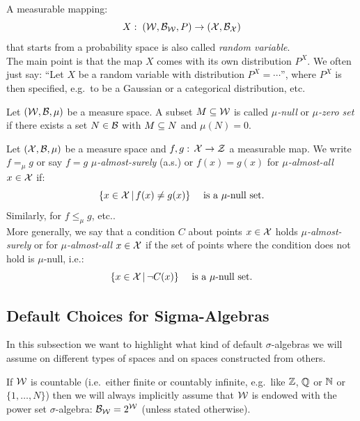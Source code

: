 \begin{Def}
    A measurable mapping: \[X:\; (\mathcal{W},\mathcal{B}_{\mathcal{W}},P) \to (\mathcal{X},\mathcal{B}_{\mathcal{X}})\] 
    that starts from a probability space is also called \emph{random variable}.\\
    The main point is that the map $X$ comes with its own distribution $P^X$.
    We often just say: ``Let $X$ be a random variable with distribution $P^X = \cdots$'',
    where $P^X$ is then specified, e.g.\ to be a Gaussian or a categorical distribution, etc.
\end{Def}


\begin{Def}
    Let $(\mathcal{W},\mathcal{B},\mu)$ be a measure space.
    A subset $M \subseteq \mathcal{W}$ is called \emph{$\mu$-null} or \emph{$\mu$-zero set} if there exists a set $N \in \mathcal{B}$ with $M \subseteq N$ and $\mu(N)=0$.
\end{Def}

\begin{Def}
    Let $(\mathcal{X},\mathcal{B},\mu)$ be a measure space and $f,g:\,\mathcal{X} \to \mathcal{Z}$ a measurable map.
    We write $f=_\mu g$ or say $f=g$ \emph{$\mu$-almost-surely} (a.s.) or $f(x)=g(x)$ for \emph{$\mu$-almost-all} $x \in \mathcal{X}$ 
    if:  
    \[\{ x \in \mathcal{X}\,|\,f(x)\neq g(x) \} \quad \text{ is a $\mu$-null set.} \]
    Similarly, for $f\le_\mu g$, etc.. \\
    More generally,  we say that a condition $C$ about points $x \in \mathcal{X}$ holds \emph{$\mu$-almost-surely} or for \emph{$\mu$-almost-all} $x \in \mathcal{X}$ if the set of points where the condition does not hold is $\mu$-null, i.e.:
    \[\{ x \in \mathcal{X}\,|\,\neg C(x) \} \quad \text{ is a $\mu$-null set}. \]
\end{Def}

\subsection{Default Choices for Sigma-Algebras}


In this subsection we want to highlight what kind of default $\sigma$-algebras we will assume 
on different types of spaces and on spaces constructed from others.

\begin{Rem}
    If $\mathcal{W}$ is countable (i.e.\ either finite or countably infinite, e.g.\ like $\mathbb{Z}$, $\mathbb{Q}$ or  $\mathbb{N}$ or $\{1,\dots,N\}$) 
    then we will always implicitly assume that $\mathcal{W}$ is endowed with the power set $\sigma$-algebra: $\mathcal{B}_{\mathcal{W}} = 2^{\mathcal{W}}$ (unless stated otherwise).
\end{Rem}


